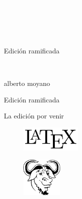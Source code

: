 \newpage
\thispagestyle{empty}
{\textcolor{white}{.}}

\newpage
\thispagestyle{empty}
{\textcolor{white}{.}}

\newpage
\thispagestyle{empty}
{\textcolor{white}{.}}

\vspace{30mm}

\begin{center}
	\Huge{Edición ramificada}
\end{center}

\newpage
\thispagestyle{empty}
{\textcolor{white}{.}}

\newpage
\thispagestyle{empty}
\begin{center}%
{\sc\large{alberto moyano}}\\ %
\end{center}

\vspace{30mm}

\begin{center}
\LARGE{Edición ramificada}\\\vspace{10mm}

\Large{La edición por venir}
\end{center}

\vfill

\begin{figure}[b]
\centering
\includegraphics[width=30mm]{./media/logo-LaTeX.png}
\end{figure}

\newpage
\thispagestyle{empty}
\begin{figure}[t]
\centering
\vspace{-10mm}
\includegraphics[width=20mm]{./media/logo-GNU.png}\\
\end{figure}

